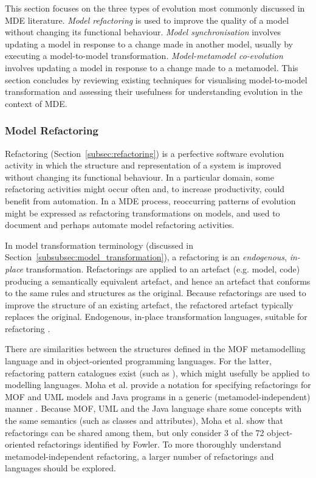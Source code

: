 This section focuses on the three types of evolution most commonly discussed in MDE literature. \emph{Model refactoring} is used to improve the quality of a model without changing its functional behaviour. \emph{Model synchronisation} involves updating a model in response to a change made in another model, usually by executing a model-to-model transformation. \emph{Model-metamodel co-evolution} involves updating a model in response to a change made to a metamodel. This section concludes by reviewing existing techniques for visualising model-to-model transformation and assessing their usefulness for understanding evolution in the context of MDE. 

\subsubsection{Model Refactoring}
Refactoring (Section~\ref{subsec:refactoring}) is a perfective software evolution activity in which the structure and representation of a system is improved without changing its functional behaviour. In a particular domain, some refactoring activities might occur often and, to increase productivity, could benefit from automation. In a MDE process, reoccurring patterns of evolution might be expressed as  refactoring transformations on models, and used to document and perhaps automate model refactoring activities. 

In model transformation terminology (discussed in Section~\ref{subsubsec:model_transformation}), a refactoring is an \emph{endogenous}, \emph{in-place} transformation. Refactorings are applied to an artefact (e.g. model, code) producing a semantically equivalent artefact, and hence an artefact that conforms to the same rules and structures as the original. Because refactorings are used to improve the structure of an existing artefact, the refactored artefact typically replaces the original. Endogenous, \cc in-place transformation languages, suitable for refactoring \cite{biermann06refactoring,porres03refactoring,kolovos07ewl}.

There are similarities between the structures defined in the MOF metamodelling language and in object-oriented programming languages. For the latter, refactoring pattern catalogues exist (such as \cite{fowler99refactoring}), which might usefully be applied to modelling languages. Moha \cc et al. provide a notation for specifying refactorings for MOF and UML models and Java programs in a generic (metamodel-independent) manner \cite{moha09refactoring}. Because MOF, UML and the Java language share some concepts with the same semantics (such as classes and attributes), Moha et al. show that refactorings can be shared among them, but only consider 3 of the 72 object-oriented refactorings identified by Fowler. To more thoroughly understand metamodel-independent refactoring, a larger number of refactorings and languages should be explored.

